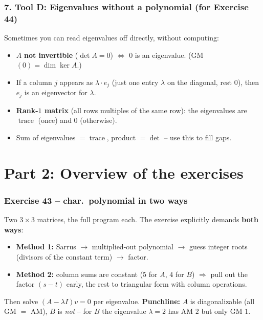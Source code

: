 \documentclass[a4paper,12pt]{article}
\begin{document}
\section*{7. Tool D: Eigenvalues without a polynomial (for Exercise 44)}

Sometimes you can read eigenvalues off directly, without computing:

\begin{merkbox}[title={Useful propositions}]
\begin{itemize}[leftmargin=*, nosep]
    \item $A$ \textbf{not invertible} ($\det A = 0$) $\Leftrightarrow$ $0$ is an eigenvalue. (GM$(0) = \dim\ker A$.)
    \item If a column $j$ appears as $\lambda \cdot e_j$ (just one entry $\lambda$ on the diagonal, rest $0$), then $e_j$ is an eigenvector for $\lambda$.
    \item \textbf{Rank-$1$ matrix} (all rows multiples of the same row): the eigenvalues are $\operatorname{trace}$ (once) and $0$ (otherwise).
    \item Sum of eigenvalues $= \operatorname{trace}$, product $= \det$ -- use this to fill gaps.
\end{itemize}
\end{merkbox}

\newpage

\part*{Part 2: Overview of the exercises}

\section*{Exercise 43 -- char.\ polynomial in two ways}

Two $3\times3$ matrices, the full program each. The exercise explicitly demands \textbf{both ways}:
\begin{itemize}[leftmargin=*, nosep]
    \item \textbf{Method 1:} Sarrus $\to$ multiplied-out polynomial $\to$ guess integer roots (divisors of the constant term) $\to$ factor.
    \item \textbf{Method 2:} column sums are constant ($5$ for $A$, $4$ for $B$) $\Rightarrow$ pull out the factor $(s-t)$ early, the rest to triangular form with column operations.
\end{itemize}
Then solve $(A - \lambda I)v = 0$ per eigenvalue. \textbf{Punchline:} $A$ is diagonalizable (all GM $=$ AM), $B$ is \emph{not} -- for $B$ the eigenvalue $\lambda = 2$ has AM $2$ but only GM $1$.
\end{document}
